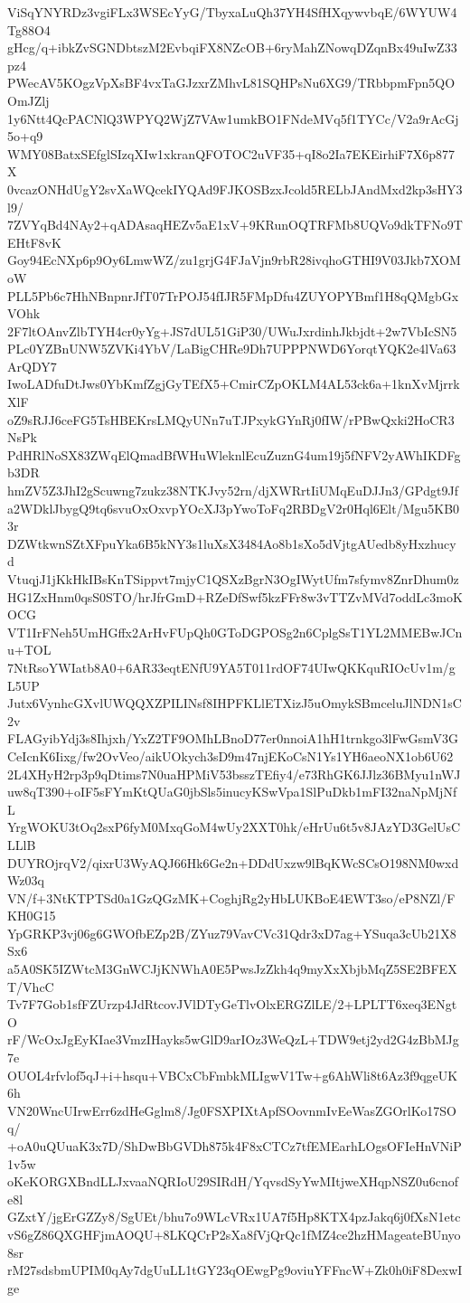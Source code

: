 ViSqYNYRDz3vgiFLx3WSEcYyG/TbyxaLuQh37YH4SfHXqywvbqE/6WYUW4Tg88O4
gHcg/q+ibkZvSGNDbtszM2EvbqiFX8NZcOB+6ryMahZNowqDZqnBx49uIwZ33pz4
PWecAV5KOgzVpXsBF4vxTaGJzxrZMhvL81SQHPsNu6XG9/TRbbpmFpn5QOOmJZlj
1y6Ntt4QcPACNlQ3WPYQ2WjZ7VAw1umkBO1FNdeMVq5f1TYCc/V2a9rAcGj5o+q9
WMY08BatxSEfglSIzqXIw1xkranQFOTOC2uVF35+qI8o2Ia7EKEirhiF7X6p877X
0vcazONHdUgY2svXaWQcekIYQAd9FJKOSBzxJcold5RELbJAndMxd2kp3sHY3l9/
7ZVYqBd4NAy2+qADAsaqHEZv5aE1xV+9KRunOQTRFMb8UQVo9dkTFNo9TEHtF8vK
Goy94EcNXp6p9Oy6LmwWZ/zu1grjG4FJaVjn9rbR28ivqhoGTHI9V03Jkb7XOMoW
PLL5Pb6c7HhNBnpnrJfT07TrPOJ54fIJR5FMpDfu4ZUYOPYBmf1H8qQMgbGxVOhk
2F7ltOAnvZlbTYH4cr0yYg+JS7dUL51GiP30/UWuJxrdinhJkbjdt+2w7VbIcSN5
PLc0YZBnUNW5ZVKi4YbV/LaBigCHRe9Dh7UPPPNWD6YorqtYQK2e4lVa63ArQDY7
IwoLADfuDtJws0YbKmfZgjGyTEfX5+CmirCZpOKLM4AL53ck6a+1knXvMjrrkXlF
oZ9sRJJ6ceFG5TsHBEKrsLMQyUNn7uTJPxykGYnRj0fIW/rPBwQxki2HoCR3NsPk
PdHRlNoSX83ZWqElQmadBfWHuWleknlEcuZuznG4um19j5fNFV2yAWhIKDFgb3DR
hmZV5Z3JhI2gScuwng7zukz38NTKJvy52rn/djXWRrtIiUMqEuDJJn3/GPdgt9Jf
a2WDklJbygQ9tq6svuOxOxvpYOcXJ3pYwoToFq2RBDgV2r0Hql6Elt/Mgu5KB03r
DZWtkwnSZtXFpuYka6B5kNY3s1luXsX3484Ao8b1sXo5dVjtgAUedb8yHxzhucyd
VtuqjJ1jKkHkIBsKnTSippvt7mjyC1QSXzBgrN3OgIWytUfm7sfymv8ZnrDhum0z
HG1ZxHnm0qsS0STO/hrJfrGmD+RZeDfSwf5kzFFr8w3vTTZvMVd7oddLc3moKOCG
VT1IrFNeh5UmHGffx2ArHvFUpQh0GToDGPOSg2n6CplgSsT1YL2MMEBwJCnu+TOL
7NtRsoYWIatb8A0+6AR33eqtENfU9YA5T011rdOF74UIwQKKquRIOcUv1m/gL5UP
Jutx6VynhcGXvlUWQQXZPILINsf8IHPFKLlETXizJ5uOmykSBmceluJlNDN1sC2v
FLAGyibYdj3s8Ihjxh/YxZ2TF9OMhLBnoD77er0nnoiA1hH1trnkgo3lFwGsmV3G
CeIcnK6Iixg/fw2OvVeo/aikUOkych3sD9m47njEKoCsN1Ys1YH6aeoNX1ob6U62
2L4XHyH2rp3p9qDtims7N0uaHPMiV53bsszTEfiy4/e73RhGK6JJlz36BMyu1nWJ
uw8qT390+oIF5sFYmKtQUaG0jbSls5inucyKSwVpa1SlPuDkb1mFI32naNpMjNfL
YrgWOKU3tOq2sxP6fyM0MxqGoM4wUy2XXT0hk/eHrUu6t5v8JAzYD3GelUsCLLlB
DUYROjrqV2/qixrU3WyAQJ66Hk6Ge2n+DDdUxzw9lBqKWcSCsO198NM0wxdWz03q
VN/f+3NtKTPTSd0a1GzQGzMK+CoghjRg2yHbLUKBoE4EWT3so/eP8NZl/FKH0G15
YpGRKP3vj06g6GWOfbEZp2B/ZYuz79VavCVc31Qdr3xD7ag+YSuqa3cUb21X8Sx6
a5A0SK5IZWtcM3GnWCJjKNWhA0E5PwsJzZkh4q9myXxXbjbMqZ5SE2BFEXT/VhcC
Tv7F7Gob1sfFZUrzp4JdRtcovJVlDTyGeTlvOlxERGZlLE/2+LPLTT6xeq3ENgtO
rF/WcOxJgEyKIae3VmzIHayks5wGlD9arIOz3WeQzL+TDW9etj2yd2G4zBbMJg7e
OUOL4rfvlof5qJ+i+hsqu+VBCxCbFmbkMLIgwV1Tw+g6AhWli8t6Az3f9qgeUK6h
VN20WncUIrwErr6zdHeGglm8/Jg0FSXPIXtApfSOovnmIvEeWasZGOrlKo17SOq/
+oA0uQUuaK3x7D/ShDwBbGVDh875k4F8xCTCz7tfEMEarhLOgsOFIeHnVNiP1v5w
oKeKORGXBndLLJxvaaNQRIoU29SIRdH/YqvsdSyYwMItjweXHqpNSZ0u6cnofe8l
GZxtY/jgErGZZy8/SgUEt/bhu7o9WLcVRx1UA7f5Hp8KTX4pzJakq6j0fXsN1etc
vS6gZ86QXGHFjmAOQU+8LKQCrP2sXa8fVjQrQc1fMZ4ce2hzHMageateBUnyo8sr
rM27sdsbmUPIM0qAy7dgUuLL1tGY23qOEwgPg9oviuYFFncW+Zk0h0iF8DexwIge
